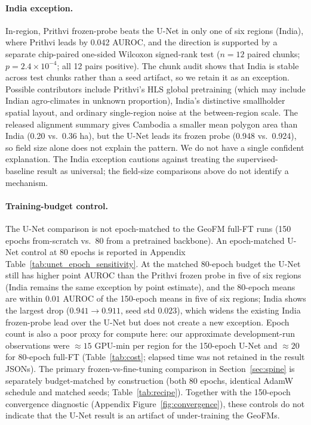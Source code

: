 \documentclass{article}
\begin{document}
\paragraph{India exception.} In-region,
Prithvi frozen-probe beats the U-Net in only one of six regions (India), where
Prithvi leads by 0.042 AUROC, and the direction is supported by a separate
chip-paired one-sided Wilcoxon
signed-rank test ($n{=}12$ paired chunks; $p{=}2.4\times10^{-4}$; all 12 pairs
positive). The chunk audit shows that India is stable across test chunks rather than
a seed artifact, so we retain it as an exception. Possible contributors include Prithvi's HLS global pretraining
(which may include Indian agro-climates in unknown proportion), India's
distinctive smallholder spatial layout, and ordinary single-region noise at the
between-region scale. The released alignment summary gives Cambodia a smaller
mean polygon area than India (0.20 vs.\ 0.36 ha), but the U-Net
leads its frozen probe (0.948 vs.\ 0.924), so field size alone does not explain the pattern. We do not have a
single confident explanation. The India exception cautions against treating the
supervised-baseline result as universal; the field-size comparisons above do not identify a mechanism.

\paragraph{Training-budget control.} The U-Net comparison is not epoch-matched to the GeoFM full-FT runs (150 epochs
from-scratch vs.\ 80 from a pretrained backbone). An epoch-matched U-Net control
at 80 epochs is reported in Appendix Table~\ref{tab:unet_epoch_sensitivity}.
At the matched 80-epoch budget the U-Net still has higher point AUROC than the
Prithvi frozen probe in five of six regions (India remains the same exception by
point estimate), and the
80-epoch means are within $0.01$ AUROC of the 150-epoch means in five of six
regions; India shows the largest drop ($0.941 \to 0.911$, seed std $0.023$),
which widens the existing India frozen-probe lead over the U-Net but does not
create a new exception. Epoch count is also a poor proxy for compute here: our
approximate development-run observations were ${\approx}15$ GPU-min per region
for the 150-epoch U-Net and ${\approx}20$ for 80-epoch full-FT
(Table~\ref{tab:cost}; elapsed time was not retained in the result JSONs). The primary
frozen-vs-fine-tuning comparison in Section~\ref{sec:spine} is separately
budget-matched by construction (both 80 epochs, identical AdamW schedule and
matched seeds; Table~\ref{tab:recipe}).
Together with the 150-epoch convergence diagnostic (Appendix
Figure~\ref{fig:convergence}), these controls do not indicate that the U-Net result
is an artifact of under-training the GeoFMs.
\end{document}
